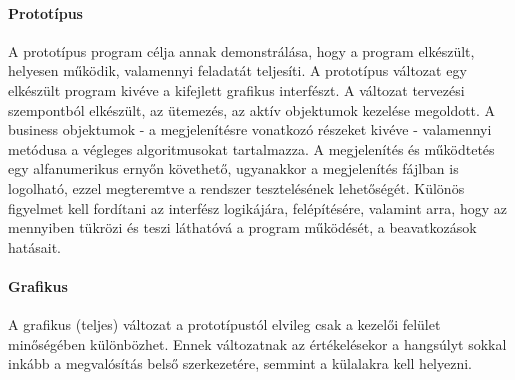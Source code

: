 \paragraph{Prototípus} A prototípus program célja annak demonstrálása, hogy a program elkészült, helyesen működik, valamennyi feladatát teljesíti. A prototípus változat egy elkészült program kivéve a kifejlett grafikus interfészt. A változat tervezési szempontból elkészült, az ütemezés, az aktív objektumok kezelése megoldott. A business objektumok - a megjelenítésre vonatkozó részeket kivéve - valamennyi metódusa a végleges algoritmusokat tartalmazza. A megjelenítés és működtetés egy alfanumerikus ernyőn követhető, ugyanakkor a megjelenítés fájlban is logolható, ezzel megteremtve a rendszer tesztelésének lehetőségét. Különös figyelmet kell fordítani az interfész logikájára, felépítésére, valamint arra, hogy az mennyiben tükrözi és teszi láthatóvá a program működését, a beavatkozások hatásait.

\paragraph{Grafikus} A grafikus (teljes) változat a prototípustól elvileg csak a kezelői felület minőségében különbözhet. Ennek
változatnak az értékelésekor a hangsúlyt sokkal inkább a megvalósítás belső szerkezetére, semmint a külalakra
kell helyezni.